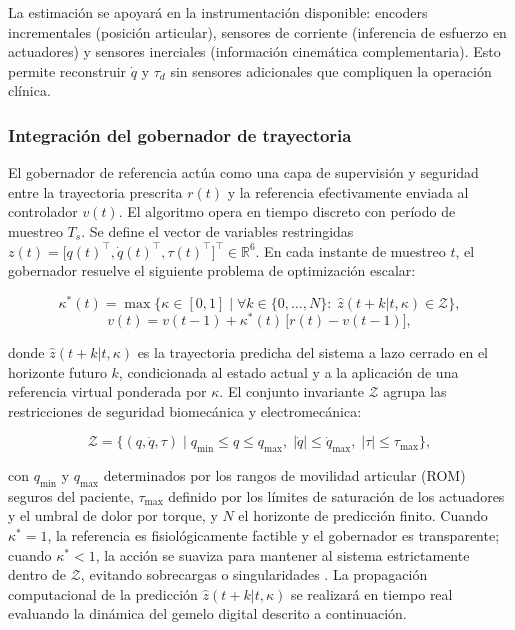 \documentclass[a4paper,12pt]{article}
\begin{document}
La estimación se apoyará en la instrumentación disponible: encoders incrementales (posición articular), sensores de corriente (inferencia de esfuerzo en actuadores) y sensores inerciales (información cinemática complementaria). Esto permite reconstruir $\dot{q}$ y $\tau_d$ sin sensores adicionales que compliquen la operación clínica.

\subsubsection{Integración del gobernador de trayectoria}

El gobernador de referencia actúa como una capa de supervisión y seguridad entre la trayectoria prescrita $r(t)$ y la referencia efectivamente enviada al controlador $v(t)$. El algoritmo opera en tiempo discreto con período de muestreo $T_s$. Se define el vector de variables restringidas $z(t)=\bigl[q(t)^{\top},\dot{q}(t)^{\top},\tau(t)^{\top}\bigr]^{\top}\in\mathbb{R}^{6}$. En cada instante de muestreo $t$, el gobernador resuelve el siguiente problema de optimización escalar:

\begin{equation}
    \kappa^{*}(t) = \max\bigl\{\kappa \in [0,1] \;\big|\; \forall k\in\{0,\ldots,N\}:\; \hat{z}(t+k|t, \kappa)\in\mathcal{Z}\bigr\},
    \label{eq:governor}
\end{equation}
\begin{equation}
    v(t) = v(t-1) + \kappa^{*}(t)\,\bigl[r(t) - v(t-1)\bigr],
    \label{eq:governor2}
\end{equation}

\noindent donde $\hat{z}(t+k|t, \kappa)$ es la trayectoria predicha del sistema a lazo cerrado en el horizonte futuro $k$, condicionada al estado actual y a la aplicación de una referencia virtual ponderada por $\kappa$. El conjunto invariante $\mathcal{Z}$ agrupa las restricciones de seguridad biomecánica y electromecánica:

\begin{equation}
    \mathcal{Z} = \bigl\{(q,\dot{q},\tau) \;\big|\; q_{\min}\leq q \leq q_{\max},\; |\dot{q}|\leq \dot{q}_{\max},\; |\tau|\leq \tau_{\max}\bigr\},
    \label{eq:Zset}
\end{equation}

\noindent con $q_{\min}$ y $q_{\max}$ determinados por los rangos de movilidad articular (ROM) seguros del paciente, $\tau_{\max}$ definido por los límites de saturación de los actuadores y el umbral de dolor por torque, y $N$ el horizonte de predicción finito. Cuando $\kappa^{*}=1$, la referencia es fisiológicamente factible y el gobernador es transparente; cuando $\kappa^{*}<1$, la acción se suaviza para mantener al sistema estrictamente dentro de $\mathcal{Z}$, evitando sobrecargas o singularidades \citep{garone2017reference}. La propagación computacional de la predicción $\hat{z}(t+k|t, \kappa)$ se realizará en tiempo real evaluando la dinámica del gemelo digital descrito a continuación.
\end{document}

